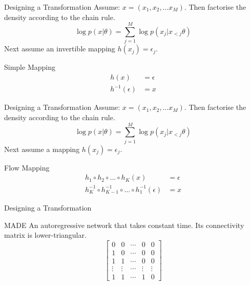 \documentclass[14pt]{beamer}
\begin{document}
\begin{frame}{Designing a Transformation}
Assume: $ x = (x_{1}, x_{2}, \ldots x_{M}) $.
Then factorise the density according to the chain rule.
\begin{equation*}
\log p(x|\theta) = \sum_{j=1}^{M} \log p(x_{j}|x_{<j}\theta)
\end{equation*}
Next assume an invertible mapping $ h(x_{j}) = \epsilon_{j} $.
\begin{block}{Simple Mapping}
\begin{equation*}
\begin{aligned}
h(x) &= \epsilon \\
h^{-1}(\epsilon) &= x
\end{aligned}
\end{equation*}
\end{block}
\end{frame}

\begin{frame}{Designing a Transformation}
Assume: $ x = (x_{1}, x_{2}, \ldots x_{M}) $.
Then factorise the density according to the chain rule.
\begin{equation*}
\log p(x|\theta) = \sum_{j=1}^{M} \log p(x_{j}|x_{<j}\theta)
\end{equation*}
Next assume a mapping $ h(x_{j}) = \epsilon_{j} $.
\begin{block}{Flow Mapping}
\begin{equation*}
\begin{aligned}
h_{1}\circ h_{2} \circ\ldots\circ h_{K}(x) &= \epsilon \\
h^{-1}_{K}\circ h^{-1}_{K-1}\circ\ldots \circ h^{-1}_{1}(\epsilon) &= x
\end{aligned}
\end{equation*}
\end{block}
\end{frame}

\begin{frame}{Designing a Transformation}
\begin{block}{MADE \citep{GermainEtAl:2015}}
An autoregressive network that takes constant time. Its connectivity matrix is lower-triangular.
\begin{equation*}
\begin{bmatrix}
0 & 0 & \cdots & 0 & 0 \\
1 & 0 & \cdots & 0 & 0 \\
1 & 1 & \cdots & 0 & 0 \\
\vdots & \vdots & \cdots & \vdots & \vdots \\
1 & 1 & \cdots & 1 & 0
\end{bmatrix}
\end{equation*}
\end{block}
\end{frame}
\end{document}
